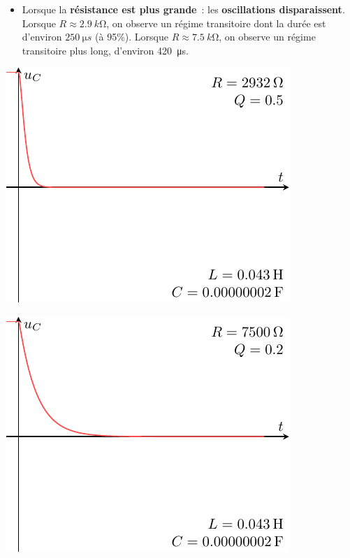 \documentclass[../../main/main.tex]{subfiles}
\begin{document}
\begin{itemize}
	\item Lorsque la \textbf{résistance est plus grande}~: les
	      \textbf{oscillations disparaissent}.
	      \bigbreak
	      Lorsque $R \approx \SI{2,9}{k\ohm}$, on
	      observe un régime transitoire dont la durée est d'environ
	      $\SI{250}{\micro s}$ (à 95\%). Lorsque $R \approx \SI{7.5}{k\ohm}$, on
	      observe un régime transitoire plus long, d'environ \SI{420}{\micro s}.
\end{itemize}
\begin{minipage}{0.45\linewidth}
	\begin{center}
		\includegraphics[width=.7\linewidth]{carac-rlc-05}
	\end{center}
\end{minipage}
\hfill
\begin{minipage}{0.45\linewidth}
	\begin{center}
		\includegraphics[width=.7\linewidth]{carac-rlc-02}
	\end{center}
\end{minipage}
\end{document}
